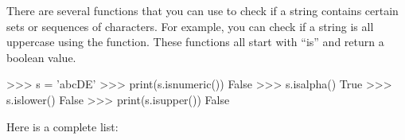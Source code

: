 \documentclass[11pt]{cselabheader}
\begin{document}
There are several functions that you can use to check if
a string contains certain sets or sequences of characters.
For example, you can check if a string is all uppercase using the
 function. These functions all start with
``is'' and return a boolean value.

\begin{pyconcode}
>>> s = 'abcDE'
>>> print(s.isnumeric())
False
>>> s.isalpha()
True
>>> s.islower()
False
>>> print(s.isupper())
False

\end{pyconcode}

Here is a complete list:

\end{document}
